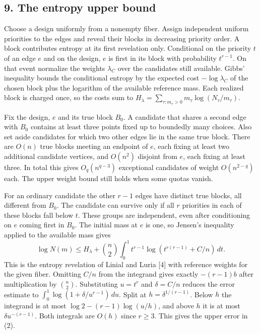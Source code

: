 \documentclass[english,11pt,a4paper]{article}
\newcounter{none}
\begin{document}
\subsection{9. The entropy upper bound}\label{the-entropy-upper-bound}

Choose a design uniformly from a nonempty fiber. Assign independent uniform priorities to the edges and reveal their blocks in decreasing priority order. A block contributes entropy at its first revelation only. Conditional on the priority \(t\) of an edge \(e\) and on the design, \(e\) is first in its block with probability \(t^{r-1}\). On that event normalize the weights \(\lambda_C\) over the candidates still available. Gibbs' inequality bounds the conditional entropy by the expected cost \(-\log\lambda_C\) of the chosen block plus the logarithm of the available reference mass. Each realized block is charged once, so the costs sum to \(H_\lambda=\sum_{\tau:m_\tau>0}m_\tau\log(N_\tau/m_\tau)\).

Fix the design, \(e\) and its true block \(B_0\). A candidate that shares a second edge with \(B_0\) contains at least three points fixed up to boundedly many choices. Also set aside candidates for which two other edges lie in the same true block. There are \(O(n)\) true blocks meeting an endpoint of \(e\), each fixing at least two additional candidate vertices, and \(O(n^2)\) disjoint from \(e\), each fixing at least three. In total this gives \(O_q(n^{q-3})\) exceptional candidates of weight \(O(n^{2-q})\) each. The upper weight bound still holds when some quotas vanish.

For an ordinary candidate the other \(r-1\) edges have distinct true blocks, all different from \(B_0\). The candidate can survive only if all \(r\) priorities in each of these blocks fall below \(t\). These groups are independent, even after conditioning on \(e\) coming first in \(B_0\). The initial mass at \(e\) is one, so Jensen's inequality applied to the available mass gives \[\log N(m)\le H_\lambda+\binom n2\int_0^1 t^{r-1}
                 \log(t^{r(r-1)}+C/n)\,dt .\] This is the entropy revelation of Linial and Luria {[}4{]} with reference weights for the given fiber. Omitting \(C/n\) from the integrand gives exactly \(-(r-1)b\) after multiplication by \(\binom n2\). Substituting \(u=t^r\) and \(\delta=C/n\) reduces the error estimate to \(\int_0^1\log(1+\delta/u^{r-1})\,du\). Split at \(h=\delta^{1/(r-1)}\). Below \(h\) the integrand is at most \(\log 2-(r-1)\log(u/h)\), and above \(h\) it is at most \(\delta u^{-(r-1)}\). Both integrals are \(O(h)\) since \(r\ge3\). This gives the upper error in (2).
\end{document}
